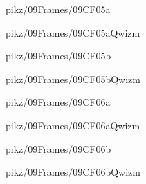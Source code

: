 \documentclass[9pt,xcolor={svgnames, x11names}]{beamer}
\begin{document}

\begin{frame}{pikz/09Frames/09CF05a}
  
\end{frame}


\begin{frame}{pikz/09Frames/09CF05aQwizm}
  
\end{frame}


\begin{frame}{pikz/09Frames/09CF05b}
  
\end{frame}


\begin{frame}{pikz/09Frames/09CF05bQwizm}
  
\end{frame}


\begin{frame}{pikz/09Frames/09CF06a}
  
\end{frame}


\begin{frame}{pikz/09Frames/09CF06aQwizm}
  
\end{frame}


\begin{frame}{pikz/09Frames/09CF06b}
  
\end{frame}


\begin{frame}{pikz/09Frames/09CF06bQwizm}
  
\end{frame}
\end{document}

